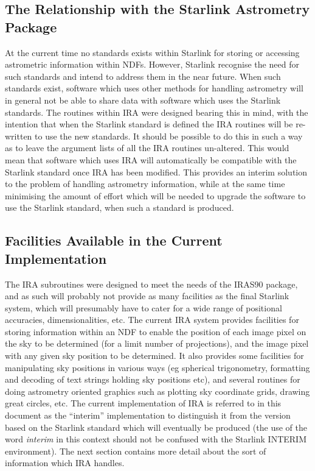 \subsection { The Relationship with the Starlink Astrometry Package}
At the current time no standards exists within Starlink for storing or accessing
astrometric information within NDFs. However, Starlink recognise the need for 
such standards and intend to address them in the near future. When such 
standards exist, software which uses other methods for handling astrometry will 
in general not be able to share data with software which uses the Starlink 
standards. The routines within IRA were designed bearing this in mind, with the 
intention that when the Starlink standard is defined the IRA routines will be 
re-written to use the new standards. It should be possible to do this in such a 
way as to leave the argument lists of all the IRA routines un-altered. This 
would mean that software which uses IRA will automatically be compatible with 
the Starlink standard once IRA has been modified. This provides an interim 
solution to the problem of handling astrometry information, while at the same 
time minimising the amount of effort which will be needed to upgrade the 
software to use the Starlink standard, when such a standard is produced.

\subsection {Facilities Available in the Current Implementation}
The IRA subroutines were designed to meet the needs of the IRAS90 package, and
as such will probably not provide as many facilities as the final Starlink
system, which will presumably have to cater for a wide range of positional
accuracies, dimensionalities, etc. The current IRA system provides facilities
for storing information within an NDF to enable the position of each image pixel
on the sky to be determined (for a limit number of projections), and the image
pixel with any given sky position to be determined. It also provides some
facilities for manipulating sky positions in various ways (eg spherical
trigonometry, formatting and decoding of text strings holding sky positions
etc), and several routines for doing astrometry oriented graphics such as
plotting sky coordinate grids, drawing great circles, etc. The current
implementation of IRA is referred to in this document as the ``interim''
implementation to distinguish it from the version based on the Starlink standard
which will eventually be produced (the use of the word {\em interim} in this
context should not be confused with the Starlink INTERIM environment). The next
section contains more detail about the sort of information which IRA handles. 


